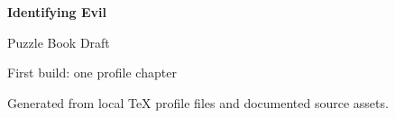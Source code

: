 \documentclass[11pt,oneside]{book}
\begin{document}
\frontmatter
{}

\begin{titlepage}
  \centering
  \vspace*{1.2in}
  {\Huge\bfseries Identifying Evil\par}
  \vspace{0.35in}
  {\Large Puzzle Book Draft\par}
  \vfill
  {\large First build: one profile chapter\par}
  \vspace{0.2in}
  {\small Generated from local TeX profile files and documented source assets.\par}
\end{titlepage}

\tableofcontents

\mainmatter


\end{document}
